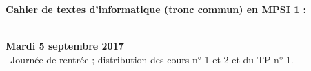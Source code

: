 \documentclass[12pt,a4paper]{article}
\begin{document}
\begin{center}
\Large\bf Cahier de textes d'informatique (tronc commun) en MPSI 1 :
\end{center}
\vspace{1cm}
\vspace{.4cm}\\

\noindent\textbf{Mardi 5 septembre 2017}\\
\bu\ Journée de rentrée ; distribution des cours n° 1 et 2 et du TP n° 1. 

\label{end}
\end{document}

